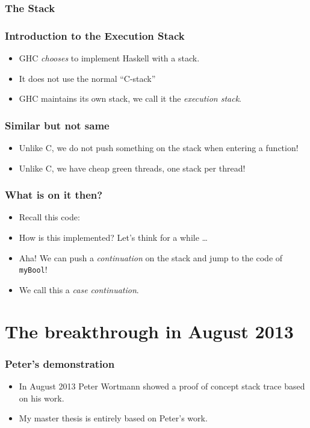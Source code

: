 \documentclass[11pt]{beamer} %
\begin{document}
\subsubsection{The Stack}

  \begin{frame}
   \frametitle{Introduction to the Execution Stack}
  \begin{itemize}
   \item <1-> GHC \emph{chooses} to implement Haskell with a stack.
   \item <2-> It does not use the normal ``C-stack''
   \item <3-> GHC maintains its own stack, we call it the \emph{execution stack}.
  \end{itemize}
  \end{frame}

  \begin{frame}
   \frametitle{Similar but not same}
  \begin{itemize}
   \item <1-> Unlike C, we do not push something on the stack when entering a function!
   \item <2-> Unlike C, we have cheap green threads, one stack per thread!
  \end{itemize}
  \end{frame}

  \begin{frame}
   \frametitle{What is on it then?}
  \begin{itemize}
   \item <1-> Recall this code:
     \caseCode
   \item <2-> How is this implemented? Let's think for a while \dots
   \item <3-> Aha! We can push a \emph{continuation} on the stack and jump to the code of \texttt{myBool}!
   \item <4-> We call this a \emph{case continuation}.
  \end{itemize}
  \end{frame}

\section{The breakthrough in August 2013}

  \begin{frame}
   \frametitle{Peter's demonstration}
  \begin{itemize}
   \item <1-> In August 2013 Peter Wortmann showed a proof of concept stack
     trace based on his work.
   \item <2-> My master thesis is entirely based on Peter's work.
  \end{itemize}
  \end{frame}
\end{document}
